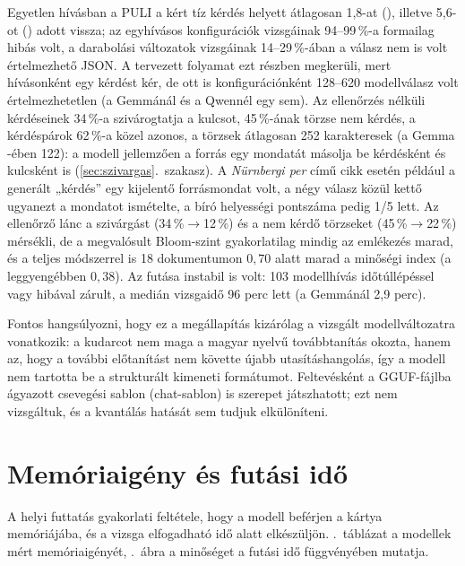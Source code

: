Egyetlen hívásban a PULI a kért tíz kérdés helyett átlagosan 1,8-at (), illetve 5,6-ot ()
adott vissza; az egyhívásos konfigurációk vizsgáinak 94--99\,\%-a formailag hibás volt, a darabolási változatok
vizsgáinak 14--29\,\%-ában a válasz nem is volt értelmezhető JSON. A tervezett folyamat ezt részben megkerüli,
mert hívásonként egy kérdést kér, de ott is konfigurációnként 128--620 modellválasz volt értelmezhetetlen (a
Gemmánál és a Qwennél egy sem). Az ellenőrzés nélküli  kérdéseinek 34\,\%-a szivárogtatja a kulcsot,
45\,\%-ának törzse nem kérdés, a kérdéspárok 62\,\%-a közel azonos, a törzsek átlagosan 252 karakteresek (a Gemma
-ében 122): a modell jellemzően a forrás egy mondatát másolja be kérdésként és kulcsként is
(\ref{sec:szivargas}.~szakasz). A \emph{Nürnbergi per} című cikk esetén például a generált „kérdés” egy kijelentő forrásmondat
volt, a négy válasz közül kettő ugyanezt a mondatot ismételte, a bíró helyességi pontszáma pedig 1/5 lett. Az ellenőrző lánc a szivárgást
(34\,\%$\to$12\,\%) és a nem kérdő törzseket (45\,\%$\to$22\,\%) mérsékli, de a megvalósult Bloom-szint
gyakorlatilag mindig az emlékezés marad, és a teljes módszerrel is 18 dokumentumon $0{,}70$ alatt marad a
minőségi index (a leggyengébben $0{,}38$). Az  futása instabil is volt: 103 modellhívás időtúllépéssel
vagy hibával zárult, a medián vizsgaidő 96 perc lett (a Gemmánál 2,9 perc).

Fontos hangsúlyozni, hogy ez a megállapítás kizárólag a vizsgált modellváltozatra vonatkozik: a kudarcot nem
maga a magyar nyelvű továbbtanítás okozta, hanem az, hogy a további előtanítást nem követte újabb
utasításhangolás, így a modell nem tartotta be a strukturált kimeneti formátumot. Feltevésként a GGUF-fájlba ágyazott csevegési sablon (chat-sablon) is szerepet
játszhatott; ezt nem vizsgáltuk, és a kvantálás hatását sem tudjuk elkülöníteni.

\section{Memóriaigény és futási idő}
\label{sec:fo-eroforras}

A helyi futtatás gyakorlati feltétele, hogy a modell beférjen a kártya memóriájába, és a vizsga
elfogadható idő alatt elkészüljön. \Az{\ref{tab:eroforras}}.~táblázat a modellek mért memóriaigényét,
\az{\ref{fig:minoseg-ido}}.~ábra a minőséget a futási idő függvényében mutatja.

